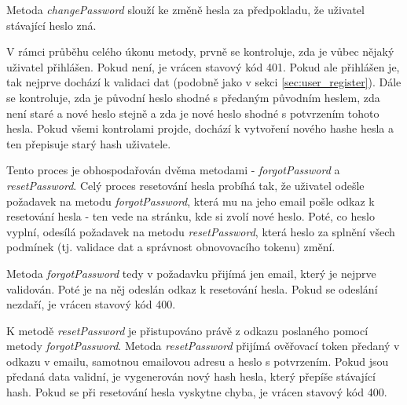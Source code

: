 			\label{sec:user_changepassword}
			Metoda \textit{changePassword} slouží ke změně hesla za předpokladu, že uživatel stávající heslo zná.
			
			V rámci průběhu celého úkonu metody, prvně se kontroluje, zda je vůbec nějaký uživatel přihlášen. Pokud není, je vrácen stavový kód 401. Pokud ale přihlášen je, tak nejprve dochází k validaci dat (podobně jako v sekci \ref{sec:user_register}). Dále se kontroluje, zda je původní heslo shodné s předaným původním heslem, zda není staré a nové heslo stejně a zda je nové heslo shodné s potvrzením tohoto hesla. Pokud všemi kontrolami projde, dochází k vytvoření nového hashe hesla a ten přepisuje starý hash uživatele.
			
			 \label{sec:user_reset_forgot_password}
			Tento proces je obhospodařován dvěma metodami - \textit{forgotPassword} a \textit{resetPassword}. Celý proces resetování hesla probíhá tak, že uživatel odešle požadavek na metodu \textit{forgotPassword}, která mu na jeho email pošle odkaz k resetování hesla - ten vede na stránku, kde si zvolí nové heslo. Poté, co heslo vyplní, odesílá požadavek na metodu \textit{resetPassword}, která heslo za splnění všech podmínek (tj. validace dat a správnost obnovovacího tokenu) změní. 
			
			Metoda \textit{forgotPassword} tedy v požadavku přijímá jen email, který je nejprve validován. Poté je na něj odeslán odkaz k resetování hesla. Pokud se odeslání nezdaří, je vrácen stavový kód 400.
			
			K metodě \textit{resetPassword} je přistupováno právě z odkazu poslaného pomocí metody \textit{forgotPassword}. Metoda \textit{resetPassword} přijímá ověřovací token předaný v odkazu v emailu, samotnou emailovou adresu a heslo s potvrzením. Pokud jsou předaná data validní, je vygenerován nový hash hesla, který přepíše stávající hash. Pokud se při resetování hesla vyskytne chyba, je vrácen stavový kód 400.
			

